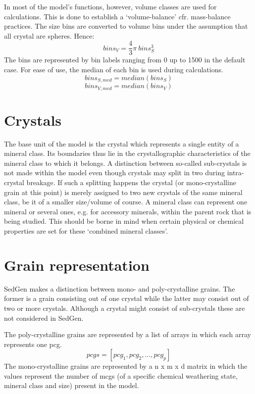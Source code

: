 In most of the model's functions, however, volume classes are used for calculations. %
This is done to establish a `volume-balance' cfr. mass-balance practices. %
The size bins are converted to volume bins under the assumption that all crystal are spheres. %
Hence:
    \begin{equation}
        bins_{V} = \frac{4}{3} \pi\ bins_{S}^{3}
    \end{equation}
The bins are represented by bin labels ranging from 0 up to 1500 in the default case. %
For ease of use, the median of each bin is used during calculations. %
    \begin{equation}
        bins_{S, med} = median(bins_{S})
    \end{equation}
    \begin{equation}
        bins_{V, med} = median(bins_{V})
    \end{equation}


\section{Crystals}
The base unit of the model is the crystal which represents a single entity of a mineral class. %
Its boundaries thus lie in the crystallographic characteristics of the mineral class to which it belongs. %
A distinction between so-called sub-crystals is not made within the model even though crystals may split in two during intra-crystal breakage. %
If such a splitting happens the crystal (or mono-crystalline grain at this point) is merely assigned to two new crystals of the same mineral class, be it of a smaller size/volume of course. %
A mineral class can represent one mineral or several ones, e.g. for accessory minerals, within the parent rock that is being studied. %
This should be borne in mind when certain physical or chemical properties are set for these `combined mineral classes'. %



\section{Grain representation}
SedGen makes a distinction between mono- and poly-crystalline grains. %
The former is a grain consisting out of one crystal while the latter may consist out of two or more crystals. %
Although a crystal might consist of sub-crystals these are not considered in SedGen. %

The poly-crystalline grains are represented by a list of arrays in which each array represents one pcg.
\begin{equation}
    pcgs = [pcg_1, pcg_2, \ldots, pcg_p]
\end{equation}
The mono-crystalline grains are represented by a n x m x d matrix in which the values represent the number of mcgs (of a specific chemical weathering state, mineral class and size) present in the model. %

